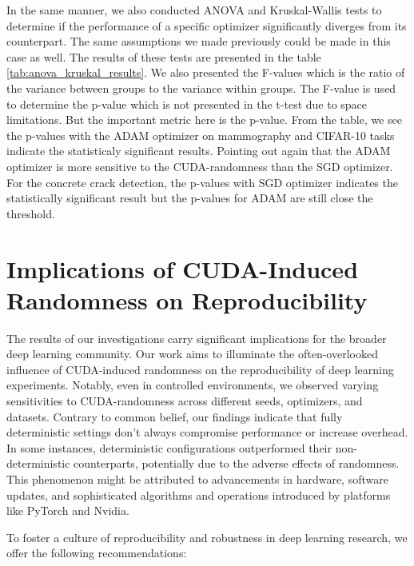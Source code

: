 In the same manner, we also conducted ANOVA and Kruskal-Wallis tests to determine if the performance of a specific optimizer significantly diverges from its counterpart. The same assumptions we made previously could be made in this case as well. The results of these tests are presented in the table \ref{tab:anova_kruskal_results}. We also presented the F-values which is the ratio of the variance between groups to the variance within groups. The F-value is used to determine the p-value which is not presented in the t-test due to space limitations. But the important metric here is the p-value. From the table, we see the p-values with the ADAM optimizer on mammography and CIFAR-10 tasks indicate the statisticaly significant results. Pointing out again that the ADAM optimizer is more
sensitive to the CUDA-randomness than the SGD optimizer. For the concrete crack detection, the p-values with SGD optimizer indicates the statistically significant result but the p-values for ADAM are still close the threshold.\\

\section{Implications of CUDA-Induced Randomness on Reproducibility}
The results of our investigations carry significant implications for the broader deep learning community. Our work aims to illuminate the often-overlooked influence of CUDA-induced randomness on the reproducibility of deep learning experiments. Notably, even in controlled environments, we observed varying sensitivities to CUDA-randomness across different seeds, optimizers, and datasets. Contrary to common belief, our findings indicate that fully deterministic settings don't always compromise performance or increase overhead. In some instances, deterministic configurations outperformed their non-deterministic counterparts, potentially due to the adverse effects of randomness. This phenomenon might be attributed to advancements in hardware, software updates, and sophisticated algorithms and operations introduced by platforms like PyTorch and Nvidia.

To foster a culture of reproducibility and robustness in deep learning research, we offer the following recommendations:


